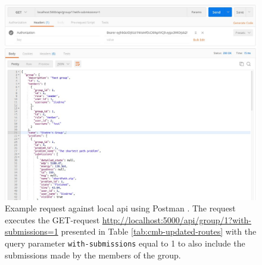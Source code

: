 \begin{figure}[b!]
    \centering
    \includegraphics[width=1.0\textwidth]{figs/postman_request.jpg}
    \caption[Example request against local API]{Example request against local \gls{api} using Postman \cite{POSTMAN}. The request executes the GET-request \url{http://localhost:5000/api/group/1?with-submissions=1} presented in Table \ref{tab:cmb-updated-routes} with the query parameter \texttt{with-submissions} equal to 1 to also include the submissions made by the members of the group.}
    \label{fig:postman-request}
\end{figure}

